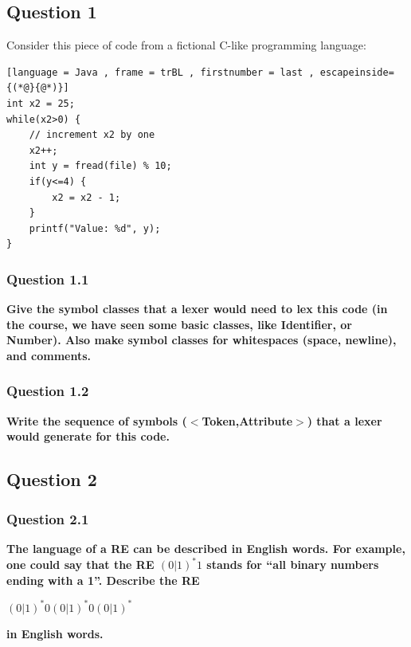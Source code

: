 \subsection{Question 1}
    
        Consider this piece of code from a fictional C-like programming language:
        \begin{lstlisting}[language = Java , frame = trBL , firstnumber = last , escapeinside={(*@}{@*)}]                 
int x2 = 25;
while(x2>0) {
    // increment x2 by one
    x2++;
    int y = fread(file) % 10;
    if(y<=4) {
        x2 = x2 - 1;
    }
    printf("Value: %d", y);
}
        \end{lstlisting}
        
        \subsubsection{Question 1.1}
    
            \textbf{Give the symbol classes that a lexer would need to lex this code (in the course, we have seen
            some basic classes, like Identifier, or Number). Also make symbol classes for whitespaces
            (space, newline), and comments.} \\
            
            
            
        \subsubsection{Question 1.2}
            \textbf{Write the sequence of symbols ($<$Token,Attribute$>$) that a lexer would generate for this code.} \\
            
            
            
    \subsection{Question 2}

        \subsubsection{Question 2.1}
        \textbf{The language of a RE can be described in English words. For example, one could say that the
        RE $(0|1)^{*}1$ stands for “all binary numbers ending with a 1”. Describe the RE} 
        \begin{center}
            $(0|1)^{*}0(0|1)^{*}0(0|1)^{*}$
        \end{center}
        \textbf{in English words.} \\
        
